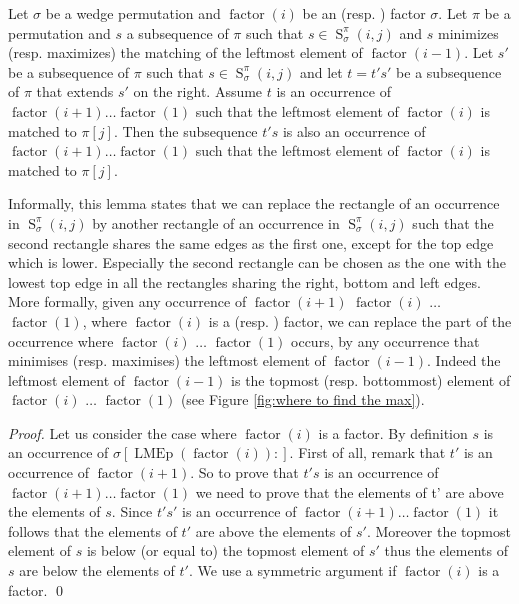 \documentclass[a4paper]{llncs}
\newcommand{\RLMin}{\text{RLMin}\xspace}
\newcommand{\RLMax}{\text{RLMax}\xspace}
\newcommand{\ptext}{\pi}
\newcommand{\ppattern}{\sigma}
\DeclareMathOperator{\LMEi}{LMEp}
\DeclareMathOperator{\factor}{factor}
\DeclareMathOperator{\SETa}{S}
\newcommand{\SET}[4]{\SETa_{{#1}}^{{#2}}({#3},{#4})}
\begin{document}
\begin{lemma}
\label{lemma:ts}
Let $\ppattern$ be a wedge permutation and
$\factor(i)$ be an \RLMin (resp. \RLMax) factor $\sigma$.
Let $\pi$ be a permutation and $s$ a subsequence of $\pi$ such that
$s \in \SET{\ppattern}{\ptext}{i}{j}$ and
$s$ minimizes (resp. maximizes) the matching of the leftmost element of $\factor(i-1)$.
Let $s'$ be a subsequence of $\pi$ such that
$s \in \SET{\ppattern}{\ptext}{i}{j}$
and let $t=t's'$ be a subsequence of $\pi$ that extends $s'$ on the right.
Assume $t$ is an occurrence of $\factor(i+1)\ldots \factor(1)$ such that the leftmost element of $\factor(i)$ is matched to $\ptext[j]$. Then the subsequence $t's$ is also an occurrence of $\factor(i+1)\ldots \factor(1)$ such that the leftmost element of $\factor(i)$ is matched to $\ptext[j]$.
\end{lemma}

Informally, this lemma states that we can replace
the rectangle of an occurrence in $\SET{\ppattern}{\ptext}{i}{j}$
by another rectangle of an occurrence in $\SET{\ppattern}{\ptext}{i}{j}$
such that the second rectangle shares the same edges as the first one,
except for the top edge which is lower.
Especially the second rectangle can be chosen as the one with
the lowest top edge in all the rectangles sharing the right, bottom
and left edges.
More formally, given any occurrence of $\factor(i+1)$ $\factor(i)$ $\ldots$ $\factor(1)$,
where $\factor(i)$ is a \RLMin (resp. \RLMax) factor,
we can replace the part of the occurrence where $\factor(i)$ $\ldots$ $\factor(1)$ occurs, by any occurrence
that minimises (resp. maximises) the leftmost element of $\factor(i-1)$. Indeed the leftmost element of $\factor(i-1)$ is the topmost (resp. bottommost) element of  $\factor(i)$ $\ldots$ $\factor(1)$ (see Figure \ref{fig:where to find the max}).

\begin{proof} %
Let us consider the case where $\factor(i)$ is a \RLMin factor.
By definition $s$ is an occurrence of $\ppattern[\LMEi(\factor(i)):]$.
First of all, remark that $t'$ is an occurrence of $\factor(i+1)$.
So to prove that $t's$ is an occurrence of $\factor(i+1)\ldots \factor(1)$ we need to prove that the elements of t' are above the elements of $s$.
Since $t's'$ is an occurrence of $\factor(i+1)\ldots \factor(1)$ it follows that the elements of $t'$ are above the elements of $s'$. Moreover the topmost element of $s$ is below (or equal to) the topmost element of $s'$ thus the elements of $s$ are below the elements of $t'$. We use a symmetric argument if $\factor(i)$ is a \RLMax factor.
\qed
\end{proof}
\end{document}
